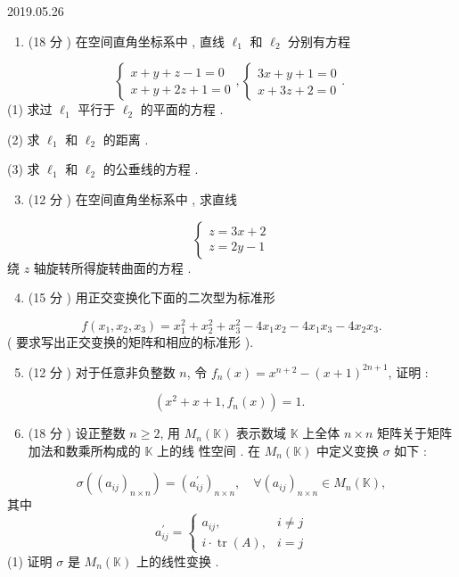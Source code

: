 \documentclass[10pt]{article}
\begin{document}
   

2019.05.26

\begin{enumerate}
  \item (18  分 )  在空间直角坐标系中 ,  直线  $\ell_{1}$  和  $\ell_{2}$  分别有方程 
\end{enumerate}
$$
\left\{\begin{array}{r}
x+y+z-1=0 \\
x+y+2 z+1=0
\end{array},\left\{\begin{array}{l}
3 x+y+1=0 \\
x+3 z+2=0
\end{array}\right. \text {. }\right.
$$
(1)  求过  $\ell_{1}$  平行于  $\ell_{2}$  的平面的方程 .

(2)  求  $\ell_{1}$  和  $\ell_{2}$  的距离 .

(3)  求  $\ell_{1}$  和  $\ell_{2}$  的公垂线的方程 .

\begin{enumerate}
  \setcounter{enumi}{2}
  \item (12  分 )  在空间直角坐标系中 ,  求直线 
\end{enumerate}
$$
\left\{\begin{array}{l}
z=3 x+2 \\
z=2 y-1
\end{array}\right.
$$
 绕  $z$  轴旋转所得旋转曲面的方程 .

\begin{enumerate}
  \setcounter{enumi}{3}
  \item (15  分 )  用正交变换化下面的二次型为标准形 
\end{enumerate}
$$
f\left(x_{1}, x_{2}, x_{3}\right)=x_{1}^{2}+x_{2}^{2}+x_{3}^{2}-4 x_{1} x_{2}-4 x_{1} x_{3}-4 x_{2} x_{3} .
$$
( 要求写出正交变换的矩阵和相应的标准形 ).

\begin{enumerate}
  \setcounter{enumi}{4}
  \item (12  分 )  对于任意非负整数  $n$,  令  $f_{n}(x)=x^{n+2}-(x+1)^{2 n+1}$,  证明 :
\end{enumerate}
$$
\left(x^{2}+x+1, f_{n}(x)\right)=1 \text {. }
$$

\begin{enumerate}
  \setcounter{enumi}{5}
  \item (18  分 )  设正整数  $n \geqslant 2$,  用  $M_{n}(\mathbb{K})$  表示数域  $\mathbb{K}$  上全体  $n \times n$  矩阵关于矩阵加法和数乘所构成的  $\mathbb{K}$  上的线   性空间 . 在  $M_{n}(\mathbb{K})$  中定义变换  $\sigma$  如下 :
\end{enumerate}
$$
\sigma\left(\left(a_{i j}\right)_{n \times n}\right)=\left(a_{i j}^{\prime}\right)_{n \times n}, \quad \forall\left(a_{i j}\right)_{n \times n} \in M_{n}(\mathbb{K}),
$$
 其中 
$$
a_{i j}^{\prime}= \begin{cases}a_{i j}, & i \neq j \\ i \cdot \operatorname{tr}(A), & i=j\end{cases}
$$
(1)  证明  $\sigma$  是  $M_{n}(\mathbb{K})$  上的线性变换 .
\end{document}
